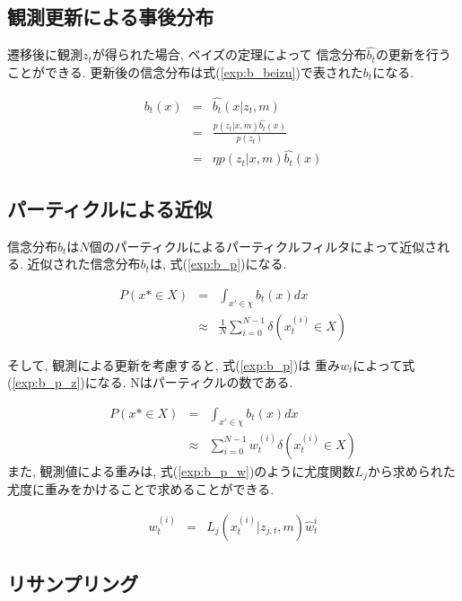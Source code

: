 \subsection{観測更新による事後分布}

遷移後に観測$z_t$が得られた場合, ベイズの定理によって
信念分布$\hat{b_t}$の更新を行うことができる. 
更新後の信念分布は式(\ref{exp:b_beizu})で表された$b_t$になる. 

\begin{eqnarray}
  \label{exp:b_beizu}
  b_t(x) &=& \hat{b_t}(x|z_t, m) \nonumber \\
  &=& \frac{p(z_t|x, m)\hat{b_t}(x)}{p(z_t)} \nonumber \\
  &=& \eta p(z_t|x, m)\hat{b_t}(x)
\end{eqnarray}

\subsection{パーティクルによる近似}

信念分布$b_t$は$N$個のパーティクルによるパーティクルフィルタによって近似される. 
近似された信念分布$b_t$は, 式(\ref{exp:b_p})になる. 

\begin{eqnarray}
  \label{exp:b_p}
  P(x*\in X) &=& \int_{x'\in\chi}b_t(x)dx \nonumber \\
  &\approx& \frac{1}{N} \sum_{i=0}^{N-1} \delta (x^{(i)}_{t} \in X)
\end{eqnarray}

そして, 観測による更新を考慮すると, 式(\ref{exp:b_p})は
重み$w_t$によって式(\ref{exp:b_p_z})になる. 
Nはパーティクルの数である. 

\begin{eqnarray}
  \label{exp:b_p_z}
  P(x*\in X) &=& \int_{x'\in\chi}b_t(x)dx \nonumber \\
  &\approx& \sum_{i=0}^{N-1} w^{(i)}_{t} \delta (x^{(i)}_{t} \in X)
\end{eqnarray}
また, 観測値による重みは, 式(\ref{exp:b_p_w})のように尤度関数$L_j$から求められた
尤度に重みをかけることで求めることができる. 

\begin{eqnarray}
  \label{exp:b_p_w}
  w_{t}^{(i)} &=& L_j(x_{t}^{(i)} | z_{j, t}, m)\hat{w}_{t}^{i}
\end{eqnarray}

\subsection{リサンプリング}

